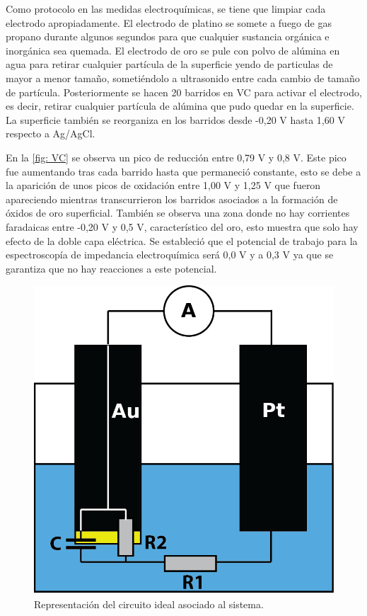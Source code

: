 \documentclass[fleqn,11pt]{SelfArx}
\begin{document}
	Como protocolo en las medidas electroquímicas, se tiene que limpiar cada electrodo apropiadamente. El electrodo de platino se somete a fuego de gas propano durante algunos segundos para que cualquier sustancia orgánica e inorgánica sea quemada. El electrodo de oro se pule con polvo de alúmina en agua para retirar cualquier partícula de la superficie yendo de particulas de mayor a menor tamaño, sometiéndolo a ultrasonido entre cada cambio de tamaño de partícula. Posteriormente se hacen 20 barridos en VC para activar el electrodo, es decir, retirar cualquier partícula de alúmina que pudo quedar en la superficie. La superficie también se reorganiza en los barridos desde -0,20 V hasta 1,60 V respecto a Ag/AgCl. 
	
	En la \autoref{fig: VC} se observa un pico de reducción entre 0,79 V y 0,8 V. Este pico fue aumentando tras cada barrido hasta que permaneció constante, esto se debe a la aparición de unos picos de oxidación entre 1,00 V y 1,25 V que fueron apareciendo mientras transcurrieron los barridos asociados a la formación de óxidos de oro superficial. También se observa una zona donde no hay corrientes faradaicas entre -0,20 V y 0,5 V, característico del oro, esto muestra que solo hay efecto de la doble capa eléctrica. Se estableció que el potencial de trabajo para la espectroscopía de impedancia electroquímica será 0,0 V y a 0,3 V ya que se garantiza que no hay reacciones a este potencial.
	
	\begin{figure}[h]
		\centering
		\includegraphics[width=0.5\linewidth]{schematic}
		\caption{Representaci\'on del circuito ideal asociado al sistema.}
		\label{fig: ideal}
	\end{figure}
\end{document}

